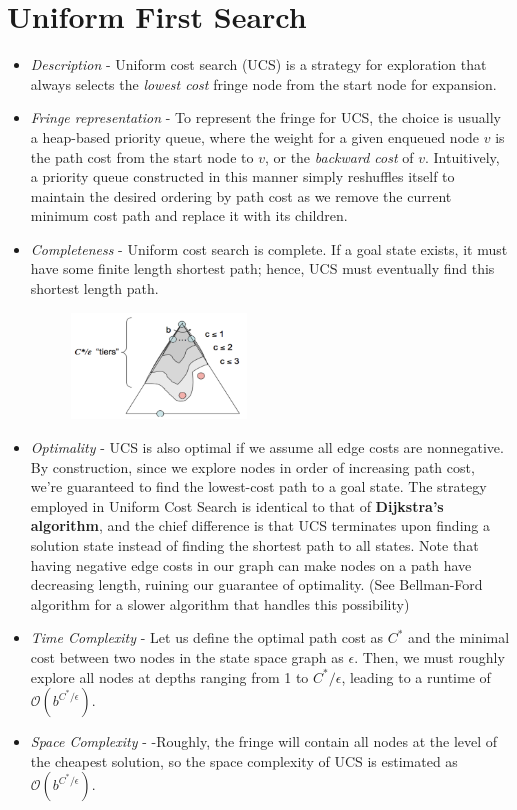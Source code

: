 \documentclass{article}[letterpaper]
\begin{document}
\section*{Uniform First Search}
\begin{itemize}
\item \textit{Description} - Uniform cost search (UCS) is a strategy for exploration that always selects the
\textit{lowest cost} fringe node from the start node for expansion.

\item \textit{Fringe representation} -
To represent the fringe for UCS, the choice is usually a heap-based priority queue, where the weight for a given enqueued node $v$ is the path cost from the start node to $v$, or the \textit{backward cost} of $v$. Intuitively, a priority queue constructed in this manner simply reshuffles itself to maintain the desired ordering by path cost as we remove the current minimum cost path and replace it with its children.

\item \textit{Completeness} - Uniform cost search is complete. If a goal state exists, it must have some finite length shortest path; hence, UCS must eventually find this shortest length path.

\begin{figure}[h]
\centering
\includegraphics[width=0.44\textwidth]{figs/UCS} 
\end{figure}


\item \textit{Optimality} - UCS is also optimal if we assume all edge costs are nonnegative. 
By construction, since we explore nodes in order of increasing path cost, we’re guaranteed to find the lowest-cost path to a goal state. The strategy employed in Uniform Cost Search is identical to that of \textbf{Dijkstra’s algorithm}, 
and the chief difference is that UCS terminates upon finding a solution state instead of finding the shortest path to all states. 
Note that having negative edge costs in our graph can make nodes on a path have decreasing length, ruining our guarantee of optimality. (See Bellman-Ford algorithm for a slower algorithm that handles this possibility)


\item \textit{Time Complexity} - 
Let us define the optimal path cost as $C^*$ and the minimal cost between two nodes in the state space graph as $\epsilon$. 
Then, we must roughly explore all nodes at depths ranging from 1 to $C^*/\epsilon$, leading to a runtime of $\mathcal{O}(b^{C^*/\epsilon})$.

\item \textit{Space Complexity}  - -Roughly, the fringe will contain all nodes at the level of the cheapest solution, so the space complexity of UCS is estimated as $\mathcal{O}(b^{C^*/\epsilon})$.
\end{itemize}
\end{document}
